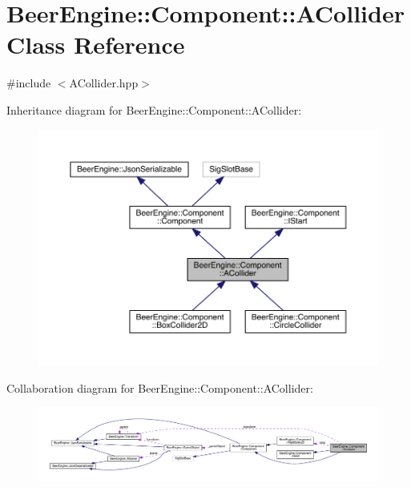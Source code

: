 \hypertarget{class_beer_engine_1_1_component_1_1_a_collider}{}\section{Beer\+Engine\+:\+:Component\+:\+:A\+Collider Class Reference}
\label{class_beer_engine_1_1_component_1_1_a_collider}


{\ttfamily \#include $<$A\+Collider.\+hpp$>$}



Inheritance diagram for Beer\+Engine\+:\+:Component\+:\+:A\+Collider\+:
\nopagebreak
\begin{figure}[H]
\begin{center}
\leavevmode
\includegraphics[width=350pt]{class_beer_engine_1_1_component_1_1_a_collider__inherit__graph}
\end{center}
\end{figure}


Collaboration diagram for Beer\+Engine\+:\+:Component\+:\+:A\+Collider\+:
\nopagebreak
\begin{figure}[H]
\begin{center}
\leavevmode
\includegraphics[width=350pt]{class_beer_engine_1_1_component_1_1_a_collider__coll__graph}
\end{center}
\end{figure}
